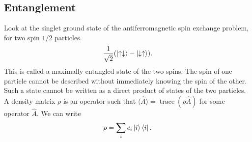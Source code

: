 \documentclass[11pt]{article}
\newcommand\E[1]{\langle #1 \rangle}
\theoremstyle{definition}
\theoremstyle{remark}
\numberwithin{equation}{section}
\begin{document}
    \subsection{Entanglement}
    Look at the singlet ground state of the antiferromagnetic spin exchange problem,
    for two spin $1 / 2$ particles. \[
        \frac{1}{\sqrt{2}}(\ket{\uparrow\downarrow} - \ket{\downarrow\uparrow}).
    \] This is called a maximally entangled state of the two spins. The spin of one
    particle cannot be described without immediately knowing the spin of the other.
    Such a state cannot be written as a direct product of states of the two
    particles. \\

    A density matrix $\rho$ is an operator such that $\E{\hat{A}} =
    \operatorname{trace}(\rho\hat{A})$ for some operator $\hat{A}$. We can write \[
        \rho = \sum_{i}c_i \ket{i}\bra{i}.
    \] 
    
    
\end{document}
